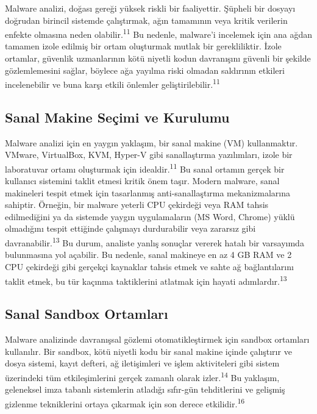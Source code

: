 Malware analizi, doğası gereği yüksek riskli bir faaliyettir. Şüpheli bir dosyayı doğrudan birincil sistemde çalıştırmak, ağın tamamının veya kritik verilerin enfekte olmasına neden olabilir.\textsuperscript{11} Bu nedenle, malware'i incelemek için ana ağdan tamamen izole edilmiş bir ortam oluşturmak mutlak bir gerekliliktir. İzole ortamlar, güvenlik uzmanlarının kötü niyetli kodun davranışını güvenli bir şekilde gözlemlemesini sağlar, böylece ağa yayılma riski olmadan saldırının etkileri incelenebilir ve buna karşı etkili önlemler geliştirilebilir.\textsuperscript{11}

\subsection{Sanal Makine Seçimi ve Kurulumu}

Malware analizi için en yaygın yaklaşım, bir sanal makine (VM) kullanmaktır. VMware, VirtualBox, KVM, Hyper-V gibi sanallaştırma yazılımları, izole bir laboratuvar ortamı oluşturmak için idealdir.\textsuperscript{11} Bu sanal ortamın gerçek bir kullanıcı sistemini taklit etmesi kritik önem taşır. Modern malware, sanal makineleri tespit etmek için tasarlanmış anti-sanallaştırma mekanizmalarına sahiptir. Örneğin, bir malware yeterli CPU çekirdeği veya RAM tahsis edilmediğini ya da sistemde yaygın uygulamaların (MS Word, Chrome) yüklü olmadığını tespit ettiğinde çalışmayı durdurabilir veya zararsız gibi davranabilir.\textsuperscript{13} Bu durum, analiste yanlış sonuçlar vererek hatalı bir varsayımda bulunmasına yol açabilir. Bu nedenle, sanal makineye en az 4 GB RAM ve 2 CPU çekirdeği gibi gerçekçi kaynaklar tahsis etmek ve sahte ağ bağlantılarını taklit etmek, bu tür kaçınma taktiklerini atlatmak için hayati adımlardır.\textsuperscript{13}

\subsection{Sanal Sandbox Ortamları}

Malware analizinde davranışsal gözlemi otomatikleştirmek için sandbox ortamları kullanılır. Bir sandbox, kötü niyetli kodu bir sanal makine içinde çalıştırır ve dosya sistemi, kayıt defteri, ağ iletişimleri ve işlem aktiviteleri gibi sistem üzerindeki tüm etkileşimlerini gerçek zamanlı olarak izler.\textsuperscript{14} Bu yaklaşım, geleneksel imza tabanlı sistemlerin atladığı sıfır-gün tehditlerini ve gelişmiş gizlenme tekniklerini ortaya çıkarmak için son derece etkilidir.\textsuperscript{16}

